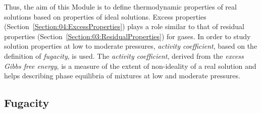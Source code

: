 \documentclass[12pts,a4paper,amsmath,amssymb,floatfix]{article}%
\begin{document}
Thus, the aim of this Module is to define thermodynamic properties of real solutions based on properties of ideal solutions. Excess properties (Section~\ref{Section:04:ExcessProperties}) plays a role similar to that of residual properties (Section~\ref{Section:03:ResidualProperties}) for gases. In order to study solution properties at low to moderate pressures, {\it activity coefficient}, based on the definition of {\it fugacity}, is used. The {\it activity coefficient}, derived from the {\it excess Gibbs free energy}, is a measure of the extent of non-ideality of a real solution and helps describing phase equilibria of mixtures at low and moderate pressures.


\subsection{Fugacity}\label{Section:05:FugacitySection}
\end{document}
